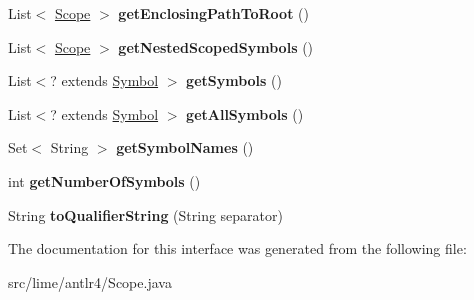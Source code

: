 \begin{DoxyCompactItemize}
\item 
\mbox{\label{interfacelime_1_1antlr4_1_1Scope_ae8867ed33fcb9f328c7ee750c4202886}} 
List$<$ \hyperlink{interfacelime_1_1antlr4_1_1Scope}{Scope} $>$ {\bfseries get\+Enclosing\+Path\+To\+Root} ()
\item 
\mbox{\label{interfacelime_1_1antlr4_1_1Scope_afdea18675031436423be0e76369c732b}} 
List$<$ \hyperlink{interfacelime_1_1antlr4_1_1Scope}{Scope} $>$ {\bfseries get\+Nested\+Scoped\+Symbols} ()
\item 
\mbox{\label{interfacelime_1_1antlr4_1_1Scope_ad873f9629210aed09d2c02651d363e49}} 
List$<$? extends \hyperlink{interfacelime_1_1antlr4_1_1Symbol}{Symbol} $>$ {\bfseries get\+Symbols} ()
\item 
\mbox{\label{interfacelime_1_1antlr4_1_1Scope_aeb4969f6d0b9e4caadbe70c7aa9d398b}} 
List$<$? extends \hyperlink{interfacelime_1_1antlr4_1_1Symbol}{Symbol} $>$ {\bfseries get\+All\+Symbols} ()
\item 
\mbox{\label{interfacelime_1_1antlr4_1_1Scope_a82efdd706f75c5192a88213a5dab8701}} 
Set$<$ String $>$ {\bfseries get\+Symbol\+Names} ()
\item 
\mbox{\label{interfacelime_1_1antlr4_1_1Scope_a6f4548cd09e74a74b532c127c16f0661}} 
int {\bfseries get\+Number\+Of\+Symbols} ()
\item 
\mbox{\label{interfacelime_1_1antlr4_1_1Scope_a91aefa36f23823d60d968ef9bede6b11}} 
String {\bfseries to\+Qualifier\+String} (String separator)
\end{DoxyCompactItemize}


The documentation for this interface was generated from the following file\+:\begin{DoxyCompactItemize}
\item 
src/lime/antlr4/Scope.\+java\end{DoxyCompactItemize}
